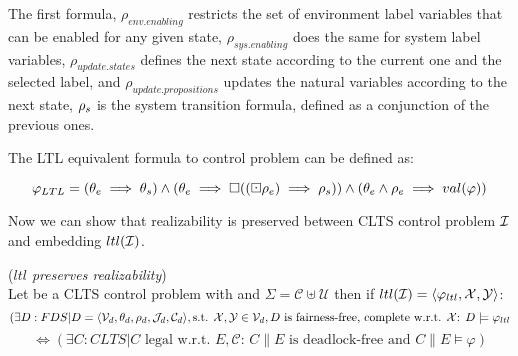 The first formula, $\rho_{env.enabling}$ restricts the set of environment label variables that can be enabled for any given state, $\rho_{sys.enabling}$ does the same for system label variables, $\rho_{update.states}$ defines the next state according to the current one and the selected label, and $\rho_{update.propositions}$ updates the natural variables according to the next state, ${\rho_s}$ is the system transition formula, defined as a conjunction of the previous ones.
%
%


The LTL equivalent formula to control problem \controlProblemDef can be defined as:

\[ \varphi_{LTL} = (\theta_e \implies \theta_s) \wedge (\theta_e \implies \square((\boxdot \rho_e) \implies \rho_s)) \wedge (\theta_e \wedge \rho_e \implies val(\varphi)) \]

Now we can show that realizability is preserved between CLTS control problem ${\mathcal{I}}$ and embedding $ltl({\mathcal{I}})$.

\begin{theorem}(\emph{$ltl$ preserves realizability})\label{theorem:gs_preserves_realizability}\\
	Let \controlProblemDef be a CLTS control problem with  and $\Sigma = \mathcal{C}\uplus \mathcal{U}$ then if $ltl({\mathcal{I}}) = \langle \varphi_{ltl}, {\mathcal{X}}, {\mathcal{Y}}\rangle$:
	\small
	\[(\exists D:FDS|D= \langle \mathcal{V}_d, \theta_d, \rho_d, \mathcal{J}_d, \mathcal{C}_d\rangle, \text{s.t. }    {\mathcal{X}}, {\mathcal{Y}} \in \mathcal{V}_d, D \text{ is fairness-free, complete w.r.t. } {\mathcal{X}} \text{: } D \models \varphi_{ltl}\]
	 \[ \iff (\exists C:CLTS| C \text{ legal w.r.t. } E,\mathcal{C} \text{: } C \parallel E \text{ is deadlock-free and } C \parallel E \models \varphi)  \]
	\normalsize
\end{theorem}


